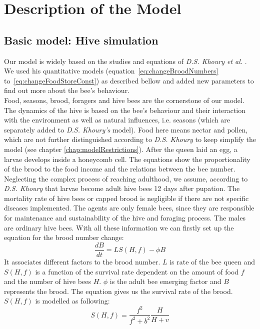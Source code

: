 \section{Description of the Model}
\subsection{Basic model: Hive simulation}
	\label{chap:basicModel}
	Our model is widely based on the studies and equations of \textit{D.S. Khoury et al.} \cite{khoury13}. We used his quantitative models (equation~\ref{eq:changeBroodNumbers} to~\ref{eq:changeFoodStoreConst}) as described bellow and added new parameters to find out more about the bee's behaviour.\\
	Food, seasons, brood, foragers and hive bees are the cornerstone of our model. The dynamics of the hive is based on the bee's behaviour and their interaction with the environment as well as natural influences, i.e. seasons (which are separately added to \textit{D.S. Khoury's} model). Food here means nectar and pollen, which are not further distinguished according to \textit{D.S. Khoury} to keep simplify the model (see chapter \ref{chap:modelRestrictions}). After the queen laid an egg, a larvae develops inside a honeycomb cell. The equations show the proportionality of the brood to the food income and the relations between the bee number. Neglecting the complex process of reaching adulthood, we assume, according to \textit{D.S. Khoury} that larvae become adult hive bees 12 days after pupation. The mortality rate of hive bees or capped brood is negligible if there are not specific diseases implemented. The agents are only female bees, since they are responsible for maintenance and sustainability of the hive and foraging process. The males are ordinary hive bees. With all these information we can firstly set up the equation for the brood number change:	
	\begin{equation}\label{eq:changeBroodNumbers}
		\frac{dB}{dt} = LS(H,f)-\phi B
	\end{equation}	
	It associates different factors to the brood number. $L$ is rate of the bee queen and $S(H,f)$ is a function of the survival rate dependent on the amount of food $f$ and the number of hive bees $H$. $\phi$ is the adult bee emerging factor and $B$ represents the brood. The equation gives us the survival rate of the brood. $S(H,f)$ is modelled as following:
	\begin{equation}\label{eq:functionHiveBeesFood}
		S(H,f)=\frac{f^2}{f^2+b^2}\frac{H}{H+v}
	\end{equation}	
